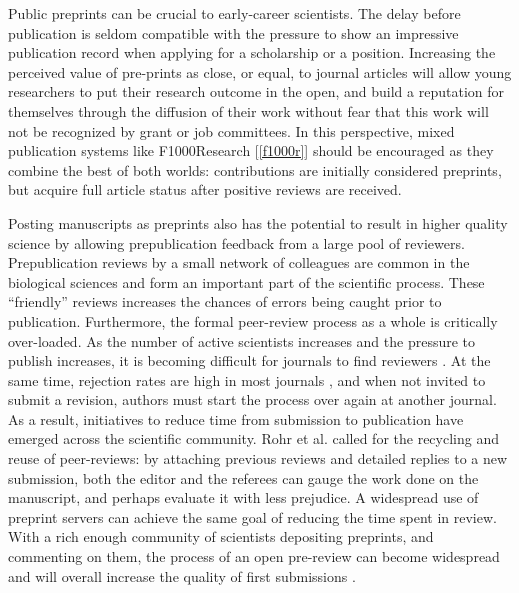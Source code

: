 \documentclass[letterpaper,twocolumn,superscriptaddress,showkeys,longbibliography]{revtex4-1}
\begin{document}
Public preprints can be crucial to early-career scientists. The delay before
publication is seldom compatible with the pressure to show an impressive
publication record when applying for a scholarship or a position. Increasing
the perceived value of pre-prints as close, or equal, to journal articles 
will allow young researchers to put their
research outcome in the open, and build a reputation for themselves through
the diffusion of their work without fear that this work will not be
recognized by grant or job committees. In this perspective, mixed publication
systems like F1000Research [\ref{f1000r}] should be encouraged as
they combine the best of both worlds: contributions are initially considered
preprints, but acquire full article status after positive reviews are
received.

Posting manuscripts as preprints also has the potential to result in higher
quality science by allowing prepublication feedback from a large pool of
reviewers. Prepublication reviews by a small network of colleagues are common in
the biological sciences and form an important part of the scientific process.
These ``friendly'' reviews increases the chances of errors being caught prior to
publication. Furthermore, the formal peer-review process as a whole is
critically over-loaded. As the number of active scientists increases and the
pressure to publish increases, it is becoming difficult for journals
to find reviewers \cite{hoc09}.  At the same time, rejection rates are high in
most journals \cite{aar08,roh09}, and when not invited to submit a revision,
authors must start the process over again at another journal. As a result,
initiatives to reduce time from submission to publication have emerged across
the scientific community. Rohr et al.  \cite{roh09} called for the recycling and
reuse of peer-reviews: by attaching previous reviews and detailed replies to a
new submission, both the editor and the referees can gauge the work done on the
manuscript, and perhaps evaluate it with less prejudice. A widespread use of
preprint servers can achieve the same goal of reducing the time spent in review.
With a rich enough community of scientists depositing preprints, and commenting
on them, the process of an open pre-review can become widespread and will
overall increase the quality of first submissions \cite{hoc12}.
\end{document}
